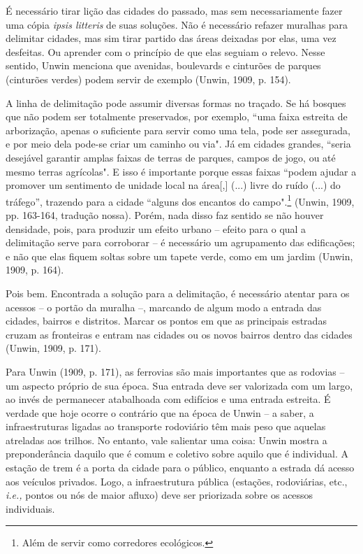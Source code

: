 \documentclass[12pt, a4paper]{book} %
\begin{document}
        É necessário tirar lição das cidades do passado, mas sem necessariamente fazer uma cópia \textit{ipsis litteris} de suas soluções. Não é necessário refazer muralhas para delimitar cidades, mas sim tirar partido das áreas deixadas por elas, uma vez desfeitas. Ou aprender com o princípio de que elas seguiam o relevo. Nesse sentido, Unwin menciona que avenidas, boulevards e cinturões de parques (cinturões verdes) podem servir de exemplo (Unwin, 1909, p. 154).

        A linha de delimitação pode assumir diversas formas no traçado. Se há bosques que não podem ser totalmente preservados, por exemplo, ``uma faixa estreita de arborização, apenas o suficiente para servir como uma tela, pode ser assegurada, e por meio dela pode-se criar um caminho ou via". Já em cidades grandes, ``seria desejável garantir amplas faixas de terras de parques, campos de jogo, ou até mesmo terras agrícolas". E isso é importante porque essas faixas ``podem ajudar a promover um sentimento de unidade local na área[,] (...) livre do ruído (...) do tráfego'', trazendo para a cidade ``alguns dos encantos do campo".\footnote[45]{Além de servir como corredores ecológicos.} (Unwin, 1909, pp. 163-164, tradução nossa). Porém, nada disso faz sentido se não houver densidade, pois, para produzir um efeito urbano – efeito para o qual a delimitação serve para corroborar – é necessário um agrupamento das edificações; e não que elas fiquem soltas sobre um tapete verde, como em um jardim (Unwin, 1909, p. 164).

        Pois bem. Encontrada a solução para a delimitação, é necessário atentar para os acessos – o portão da muralha –, marcando de algum modo a entrada das cidades, bairros e distritos. Marcar os pontos em que as principais estradas cruzam as fronteiras e entram nas cidades ou os novos bairros dentro das cidades (Unwin, 1909, p. 171).

        Para Unwin (1909, p. 171), as ferrovias são mais importantes que as rodovias – um aspecto próprio de sua época. Sua entrada deve ser valorizada com um largo, ao invés de permanecer atabalhoada com edifícios e uma entrada estreita. É verdade que hoje ocorre o contrário que na época de Unwin – a saber, a infraestruturas ligadas ao transporte rodoviário têm mais peso que aquelas atreladas aos trilhos. No entanto, vale salientar uma coisa: Unwin mostra a preponderância daquilo que é comum e coletivo sobre aquilo que é individual. A estação de trem é a porta da cidade para o público, enquanto a estrada dá acesso aos veículos privados. Logo, a infraestrutura pública (estações, rodoviárias, etc., \textit{i.e.,} pontos ou nós de maior afluxo) deve ser priorizada sobre os acessos individuais.
\end{document}
